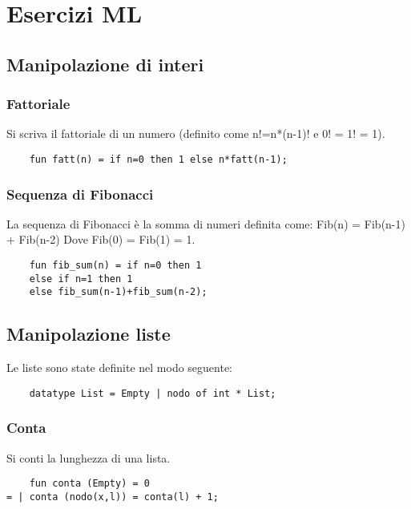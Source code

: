 \chapter{Esercizi ML}

\section{Manipolazione di interi}

\subsection{Fattoriale}

Si scriva il fattoriale di un numero (definito come n!=n*(n-1)! e 0! = 1! = 1).

\begin{lstlisting}
    fun fatt(n) = if n=0 then 1 else n*fatt(n-1);
\end{lstlisting}

\subsection{Sequenza di Fibonacci}

La sequenza di Fibonacci è la somma di numeri definita come: 
\newline
Fib(n) = Fib(n-1) + Fib(n-2)
\newline
Dove Fib(0) = Fib(1) = 1.

\begin{lstlisting}
    fun fib_sum(n) = if n=0 then 1 
    else if n=1 then 1 
    else fib_sum(n-1)+fib_sum(n-2);
\end{lstlisting}

\section{Manipolazione liste}
Le liste sono state definite nel modo seguente:

\begin{lstlisting}
    datatype List = Empty | nodo of int * List;
\end{lstlisting}

\subsection{Conta}

Si conti la lunghezza di una lista.

\begin{lstlisting}
    fun conta (Empty) = 0
= | conta (nodo(x,l)) = conta(l) + 1;
\end{lstlisting}

